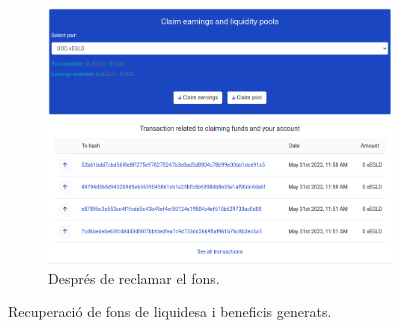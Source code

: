 \documentclass[11pt,a4paper]{article}
\begin{document}
\begin{figure}[!htb]
\begin{subfigure}[b]{0.32\textwidth}
	\end{subfigure}\hfill
	\begin{subfigure}[b]{0.32\textwidth}
	  \includegraphics[width=\linewidth]{imp-fons3.png}
	  \caption{Després de reclamar el fons.}\label{fig:imp-fons3}
	\end{subfigure}\hfill
	\caption{Recuperació de fons de liquidesa i beneficis generats.}
	\label{fig:imp-fons}
\end{figure}
\end{document}
